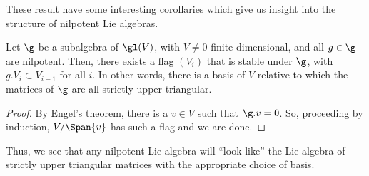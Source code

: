 \documentclass[11pt,leqno,oneside]{amsart}
\numberwithin{thm}{section}
\begin{document}
These result have some interesting corollaries which give us insight
into the structure of nilpotent Lie algebras. 
\begin{cor}
  Let \(\g\) be a subalgebra of \(\gl(V)\), with \(V \neq 0\) finite
  dimensional, and all \(g \in \g\) are nilpotent. Then, there exists
  a flag \((V_i)\) that is stable under \(\g\), with \(g.V_i \subset
  V_{i-1}\) for all \(i\). In other words, there is a basis of \(V\)
  relative to which the matrices of \(\g\) are all strictly upper
  triangular.
\end{cor}
\begin{proof}
  By Engel's theorem, there is a \(v \in V\) such that \(\g.v =
  0\). So, proceeding by induction, \(V/ \Span\{v\}\) has such a
  flag and we are done.
\end{proof}
Thus, we see that any nilpotent Lie algebra will ``look like'' the Lie
algebra of strictly upper triangular matrices with the appropriate
choice of basis.
\end{document}
